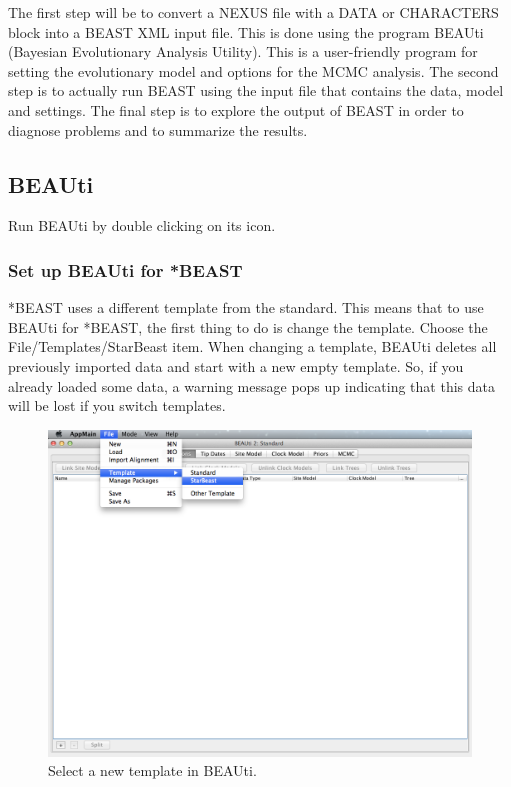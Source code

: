 \documentclass{article}
\begin{document}
The first step will be to convert a NEXUS file with a DATA or CHARACTERS block into a BEAST XML input file. This is done using the program BEAUti (Bayesian Evolutionary Analysis Utility). This is a user-friendly program for setting the evolutionary model and options for the MCMC analysis. The second step is to actually run BEAST using the input file that contains the data, model and settings. The final step is to explore the output of BEAST in order to diagnose problems and to summarize the results.

\subsection*{BEAUti}

Run BEAUti by double clicking on its icon. 

\subsubsection*{Set up BEAUti for *BEAST}

*BEAST uses a different template from the standard. This means that to use BEAUti for *BEAST, the first thing to do is change the template. Choose the File/Templates/StarBeast item. When changing a template, BEAUti deletes all previously imported data and start with a new empty template. So, if you already loaded some data, a warning message pops up indicating that this data will be lost if you switch templates.

\begin{figure}
\begin{center}

\includegraphics[scale=0.5,clip=true,trim=0 300 200 0]{figures/BEAUti_selectTemplate.png}

\end{center}
\caption{\label{fig.template} Select a new template in BEAUti.}
\end{figure}
\end{document}
